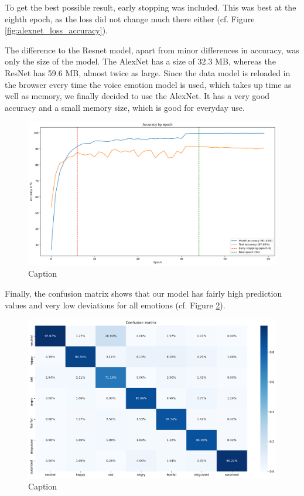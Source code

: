 To get the best possible result, early stopping was included. This was best at the eighth epoch, as the loss did not change much there either (cf. Figure \ref{fig:alexnet_loss_accuracy}). 

The difference to the Resnet model, apart from minor differences in accuracy, was only the size of the model. The AlexNet has a size of 32.3 MB, whereas the ResNet has 59.6 MB, almost twice as large. Since the data model is reloaded in the browser every time the voice emotion model is used, which takes up time as well as memory, we finally decided to use the AlexNet. It has a very good accuracy and a small memory size, which is good for everyday use. 

\begin{figure}
\centering
\includegraphics[width=1\textwidth]{assets/resnet_accuracy.png}
\caption{Caption}
\label{fig:resnet_accuracy}
\end{figure}

Finally, the confusion matrix shows that our model has fairly high prediction values and very low deviations for all emotions (cf. Figure \ref{fig:alexnet_confusion_matrix}).

\begin{figure}
\centering
\includegraphics[width=1\textwidth]{assets/alexnet_confusion_matrix.png}
\caption{Caption}
\label{fig:alexnet_confusion_matrix}
\end{figure}


